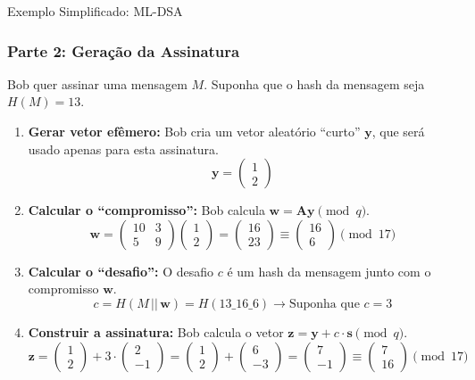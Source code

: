 \documentclass{beamer}
\begin{document}
\begin{frame}{Exemplo Simplificado: ML-DSA}
    \frametitle{Parte 2: Geração da Assinatura}
    
    Bob quer assinar uma mensagem $M$. Suponha que o hash da mensagem seja $H(M)=13$.

    \begin{enumerate}
        \small
        \item<+-> \textbf{Gerar vetor efêmero:} Bob cria um vetor aleatório ``curto'' $\mathbf{y}$, que será usado apenas para esta assinatura.
        $$ \mathbf{y} = \begin{pmatrix} 1 \\ 2 \end{pmatrix} $$
        
        \item<+-> \textbf{Calcular o ``compromisso'':} Bob calcula $\mathbf{w} = \mathbf{A}\mathbf{y} \pmod q$.
        $$ \mathbf{w} = \begin{pmatrix} 10 & 3 \\ 5 & 9 \end{pmatrix} \begin{pmatrix} 1 \\ 2 \end{pmatrix} = \begin{pmatrix} 16 \\ 23 \end{pmatrix} \equiv \begin{pmatrix} 16 \\ 6 \end{pmatrix} \pmod{17} $$
        
        \item<+-> \textbf{Calcular o ``desafio'':} O desafio $c$ é um hash da mensagem junto com o compromisso $\mathbf{w}$.
        $$ c = H(M \,||\, \mathbf{w}) = H(13\_16\_6) \rightarrow \text{Suponha que } c=3 $$
        
        \item<+-> \textbf{Construir a assinatura:} Bob calcula o vetor $\mathbf{z} = \mathbf{y} + c \cdot \mathbf{s} \pmod q$.
        $$ \mathbf{z} = \begin{pmatrix} 1 \\ 2 \end{pmatrix} + 3 \cdot \begin{pmatrix} 2 \\ -1 \end{pmatrix} = \begin{pmatrix} 1 \\ 2 \end{pmatrix} + \begin{pmatrix} 6 \\ -3 \end{pmatrix} = \begin{pmatrix} 7 \\ -1 \end{pmatrix} \equiv \begin{pmatrix} 7 \\ 16 \end{pmatrix} \pmod{17} $$
    \end{enumerate}
\end{frame}
\end{document}
